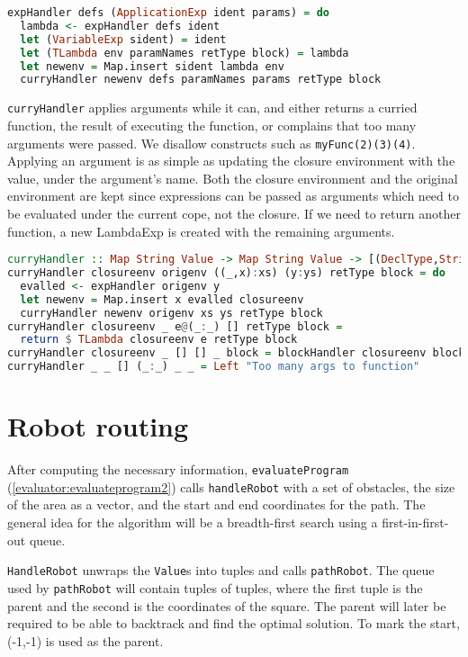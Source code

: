 \begin{lstlisting}[caption={},language=haskell]
expHandler defs (ApplicationExp ident params) = do
  lambda <- expHandler defs ident
  let (VariableExp sident) = ident
  let (TLambda env paramNames retType block) = lambda
  let newenv = Map.insert sident lambda env
  curryHandler newenv defs paramNames params retType block
\end{lstlisting}

\lstinline{curryHandler} applies arguments while it can, and either returns a curried function, the result of executing the function, or complains that too many arguments were passed. We disallow constructs such as \lstinline{myFunc(2)(3)(4)}.
Applying an argument is as simple as updating the closure environment with the value, under the argument's name. Both the closure environment and the original environment are kept since expressions can be passed as arguments which need to be evaluated under the current cope, not the closure.
If we need to return another function, a new LambdaExp is created with the remaining arguments.
\begin{lstlisting}[caption={},language=haskell]
curryHandler :: Map String Value -> Map String Value -> [(DeclType,String)] -> [Exp] -> DeclType -> Block -> Either String Value
curryHandler closureenv origenv ((_,x):xs) (y:ys) retType block = do
  evalled <- expHandler origenv y
  let newenv = Map.insert x evalled closureenv
  curryHandler newenv origenv xs ys retType block
curryHandler closureenv _ e@(_:_) [] retType block =
  return $ TLambda closureenv e retType block
curryHandler closureenv _ [] [] _ block = blockHandler closureenv block
curryHandler _ _ [] (_:_) _ _ = Left "Too many args to function"
\end{lstlisting}

\section{Robot routing}

After computing the necessary information, \lstinline{evaluateProgram} (\cref{evaluator:evaluateprogram2}) calls \lstinline{handleRobot} with a set of obstacles, the size of the area as a vector, and the start and end coordinates for the path. The general idea for the algorithm will be a breadth-first search using a first-in-first-out queue.
\par
\lstinline{HandleRobot} unwraps the \lstinline{Value}s into tuples and calls \lstinline{pathRobot}. The queue used by \lstinline{pathRobot} will contain tuples of tuples, where the first tuple is the parent and the second is the coordinates of the square. The parent will later be required to be able to backtrack and find the optimal solution. To mark the start, (-1,-1) is used as the parent. 

